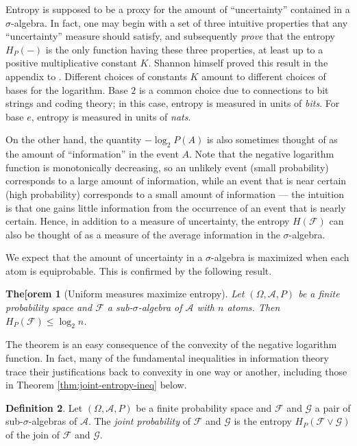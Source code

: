 \documentclass[11pt]{book}
\newtheorem{thm}{The[orem}[section]
\theoremstyle{definition}
\newtheorem{defn}[thm]{Definition}
\numberwithin{equation}{section}
\begin{document}
Entropy is supposed to be a proxy for the amount of ``uncertainty'' contained in a $\sigma$-algebra. In fact, one may begin with a set of three intuitive properties that any ``uncertainty'' measure should satisfy, and subsequently \textit{prove} that the entropy $H_P(-)$ is the only function having these three properties, at least up to a positive multiplicative constant $K$. Shannon himself proved this result in the appendix to \cite{Shannon1948}. Different choices of constants $K$ amount to different choices of bases for the logarithm. Base $2$ is a common choice due to connections to bit strings and coding theory; in this case, entropy is measured in units of \textit{bits}. For base $e$, entropy is measured in units of \textit{nats}.

On the other hand, the quantity $-\log_2{P(A)}$ is also sometimes thought of as the amount of ``information'' in the event $A$. Note that the negative logarithm function is monotonically decreasing, so an unlikely event (small probability) corresponds to a large amount of information, while an event that is near certain (high probability) corresponds to a small amount of information — the intuition is that one gains little information from the occurrence of an event that is nearly certain. Hence, in addition to a measure of uncertainty, the entropy $H(\mathcal{F})$ can also be thought of as a measure of the average information in the $\sigma$-algebra.

We expect that the amount of uncertainty in a $\sigma$-algebra is maximized when each atom is equiprobable. This is confirmed by the following result.

\begin{thm}[Uniform measures maximize entropy]\label{thm:max-entropy}
	Let $(\Omega,\mathcal{A},P)$ be a finite probability space and $\mathcal{F}$ a sub-$\sigma$-algebra of $\mathcal{A}$ with $n$ atoms. Then $H_P(\mathcal{F}) \leq \log_2{n}$.
\end{thm}

The theorem is an easy consequence of the convexity of the negative logarithm function. In fact, many of the fundamental inequalities in information theory trace their justifications back to convexity in one way or another, including those in Theorem \ref{thm:joint-entropy-ineq} below.

\begin{defn}
	Let $(\Omega,\mathcal{A},P)$ be a finite probability space and $\mathcal{F}$ and $\mathcal{G}$ a pair of sub-$\sigma$-algebras of $\mathcal{A}$. The \textit{joint probability} of $\mathcal{F}$ and $\mathcal{G}$ is the entropy $H_P(\mathcal{F} \vee \mathcal{G})$ of the join of $\mathcal{F}$ and $\mathcal{G}$.
\end{defn}
\end{document}
